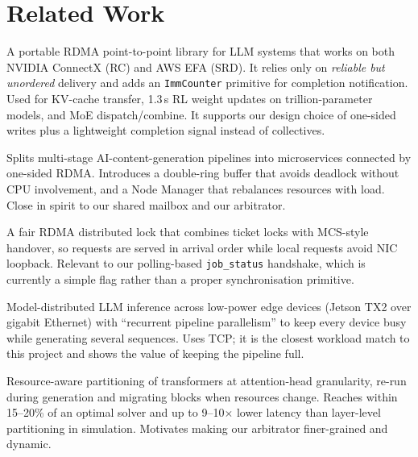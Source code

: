 \documentclass[11pt,a4paper]{article}
\begin{document}
\section{Related Work}
\begin{description}[leftmargin=*,style=nextline]
  \item[fabric-lib (Perplexity, MLSys 2026)] A portable RDMA point-to-point library for LLM systems that works on both NVIDIA ConnectX (RC) and AWS EFA (SRD). It relies only on \emph{reliable but unordered} delivery and adds an \texttt{ImmCounter} primitive for completion notification. Used for KV-cache transfer, 1.3\,s RL weight updates on trillion-parameter models, and MoE dispatch/combine. It supports our design choice of one-sided writes plus a lightweight completion signal instead of collectives.
  \item[OnePiece (Tencent WeChat, 2026)] Splits multi-stage AI-content-generation pipelines into microservices connected by one-sided RDMA. Introduces a double-ring buffer that avoids deadlock without CPU involvement, and a Node Manager that rebalances resources with load. Close in spirit to our shared mailbox and our arbitrator.
  \item[FARLock (OSDI 2026)] A fair RDMA distributed lock that combines ticket locks with MCS-style handover, so requests are served in arrival order while local requests avoid NIC loopback. Relevant to our polling-based \texttt{job\_status} handshake, which is currently a simple flag rather than a proper synchronisation primitive.
  \item[MDI-LLM (Macario et al., 2025)] Model-distributed LLM inference across low-power edge devices (Jetson TX2 over gigabit Ethernet) with ``recurrent pipeline parallelism'' to keep every device busy while generating several sequences. Uses TCP; it is the closest workload match to this project and shows the value of keeping the pipeline full.
  \item[Kafetzis et al.\ (2025)] Resource-aware partitioning of transformers at attention-head granularity, re-run during generation and migrating blocks when resources change. Reaches within 15--20\% of an optimal solver and up to 9--10$\times$ lower latency than layer-level partitioning in simulation. Motivates making our arbitrator finer-grained and dynamic.
\end{description}

\end{document}

